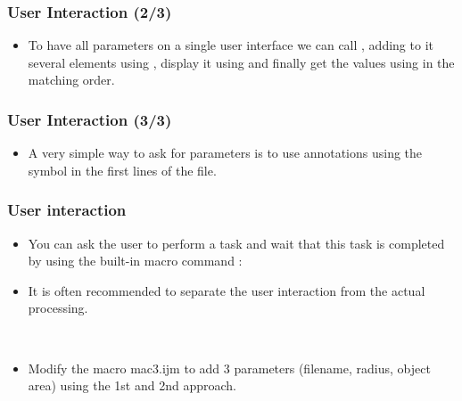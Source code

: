 \begin{frame}[fragile]
  \frametitle<presentation>{User Interaction (2/3)}
  \begin{itemize}
  \item To have all parameters on a single user interface we can
    call , adding to it several elements
    using , display it using
     and finally get the values using
     in the matching order.\par
    
  \end{itemize}
\end{frame}

\begin{frame}[fragile]
  \frametitle<presentation>{User Interaction (3/3)}
  \begin{itemize}
  \item A very simple way to ask for parameters is to use annotations
    using the  symbol in the first lines of the file.\par
    

  \end{itemize}
\end{frame}

\begin{frame}[fragile]
  \frametitle<presentation>{User interaction}
  \begin{itemize}
  \item You can ask the user to perform a task and wait that this task is
    completed by using the built-in macro command :
    
  \item It is often recommended to separate the user interaction from
    the actual processing.
  \end{itemize}
\end{frame}

\begin{frame}[fragile]
  \begin{example}~\par
    \begin{itemize}
    \item Modify the macro mac3.ijm to add 3 parameters (filename, radius,
      object area) using the 1st and 2nd approach.
    \end{itemize}
    
  \end{example}
\end{frame}

